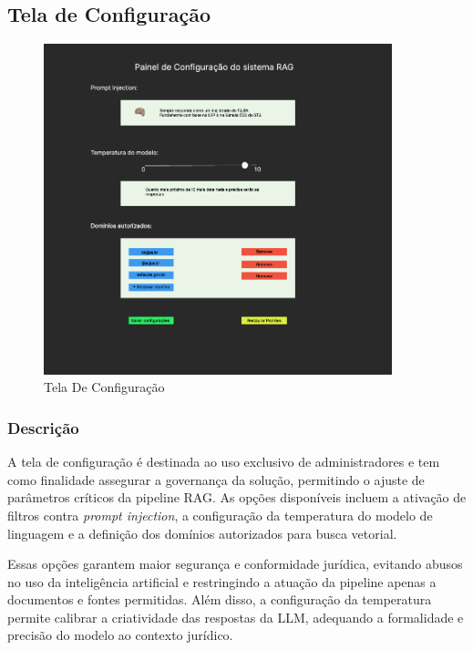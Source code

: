 \begin{description}
\subsection{Tela de Configuração}
\label{subsec:tela_configuracao}

\begin{figure}[H]
  \centering
  \includegraphics[width=0.9\textwidth]{04-figuras/image.png}
  \caption{Tela De Configuração}
  \label{fig:tela-configuracao}
\end{figure}

\subsubsection{Descrição}

A tela de configuração é destinada ao uso exclusivo de administradores e tem como finalidade assegurar a governança da solução, permitindo o ajuste de parâmetros críticos da pipeline RAG. As opções disponíveis incluem a ativação de filtros contra \emph{prompt injection}, a configuração da temperatura do modelo de linguagem e a definição dos domínios autorizados para busca vetorial.

Essas opções garantem maior segurança e conformidade jurídica, evitando abusos no uso da inteligência artificial e restringindo a atuação da pipeline apenas a documentos e fontes permitidas. Além disso, a configuração da temperatura permite calibrar a criatividade das respostas da LLM, adequando a formalidade e precisão do modelo ao contexto jurídico.


\end{description}
